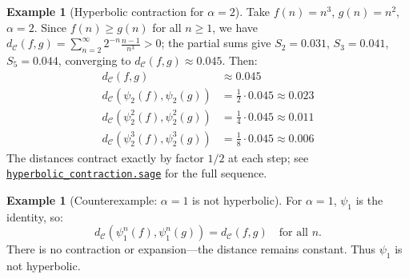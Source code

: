 \documentclass[11pt,a4paper]{article}
\newcommand{\repourl}{https://github.com/guydev42/expansive-homeomorphisms-complexity-qmetric}
\theoremstyle{plain}
\theoremstyle{definition}
\newtheorem{exampleinner}[theoreminner]{Example}
\newenvironment{example}[1][]{\begin{exampleinner}[#1]}{\end{exampleinner}}
\newcommand{\C}{\mathcal{C}}
\begin{document}
\begin{example}[Hyperbolic contraction for $\alpha=2$]\label{ex:hyperbolic-alpha2}
Take $f(n)=n^3$, $g(n)=n^2$, $\alpha=2$.  Since $f(n)\ge g(n)$
for all $n\ge 1$, we have $d_\C(f,g)=\sum_{n=2}^\infty
2^{-n}\frac{n-1}{n^3}>0$; the partial sums give $S_2=0.031$,
$S_3=0.041$, $S_5=0.044$, converging to $d_\C(f,g)\approx 0.045$.
Then:
\begin{align*}
d_\C(f,g) &\approx 0.045 \\
d_\C(\psi_2(f),\psi_2(g)) &= \tfrac{1}{2} \cdot 0.045 \approx 0.023 \\
d_\C(\psi_2^2(f),\psi_2^2(g)) &= \tfrac{1}{4} \cdot 0.045 \approx 0.011 \\
d_\C(\psi_2^3(f),\psi_2^3(g)) &= \tfrac{1}{8} \cdot 0.045 \approx 0.006
\end{align*}
The distances contract exactly by factor $1/2$ at each step;
see \href{\repourl/blob/main/code/sagemath/hyperbolic_contraction.sage}{\texttt{hyperbolic\_contraction.sage}}
for the full sequence.
\end{example}

\begin{example}[Counterexample: $\alpha=1$ is not hyperbolic]\label{ex:counter-hyperbolic}
For $\alpha=1$, $\psi_1$ is the identity, so:
\[
d_\C(\psi_1^n(f),\psi_1^n(g)) = d_\C(f,g) \quad \text{for all } n.
\]
There is no contraction or expansion—the distance remains constant.
Thus $\psi_1$ is not hyperbolic.
\end{example}
\end{document}
